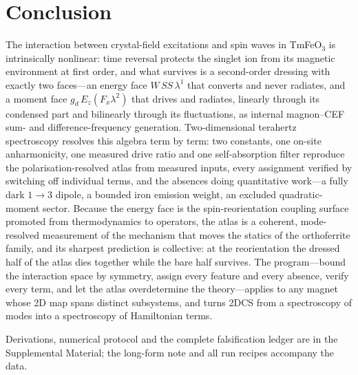 \documentclass[aps,prb,twocolumn,superscriptaddress,longbibliography]{revtex4-2}
\begin{document}
\section{Conclusion}

The interaction between crystal-field excitations and spin waves in
TmFeO$_3$ is intrinsically nonlinear: time reversal protects the
singlet ion from its magnetic environment at first order, and what
survives is a second-order dressing with exactly two faces---an
energy face $W\,SS\,\lambda^1$ that converts and never radiates, and
a moment face $g_d\,E_z(F_x\lambda^2)$ that drives and radiates,
linearly through its condensed part and bilinearly through its
fluctuations, as internal magnon--CEF sum- and difference-frequency
generation.  Two-dimensional terahertz spectroscopy resolves this
algebra term by term: two constants, one on-site anharmonicity, one
measured drive ratio and one self-absorption filter reproduce the
polarisation-resolved atlas from measured inputs, every assignment
verified by switching off individual terms, and the absences doing
quantitative work---a fully dark $1\!\to\!3$ dipole, a bounded iron
emission weight, an excluded quadratic-moment sector.  Because the
energy face is the spin-reorientation coupling surface promoted from
thermodynamics to operators, the atlas is a coherent, mode-resolved
measurement of the mechanism that moves the statics of the
orthoferrite family, and its sharpest prediction is collective: at
the reorientation the dressed half of the atlas dies together while
the bare half survives.  The program---bound the interaction space by
symmetry, assign every feature and every absence, verify every term,
and let the atlas overdetermine the theory---applies to any magnet
whose 2D map spans distinct subsystems, and turns 2DCS from a
spectroscopy of modes into a spectroscopy of Hamiltonian terms.

\begin{acknowledgments}
Derivations, numerical protocol and the complete falsification ledger are
in the Supplemental Material; the long-form note and all run recipes
accompany the data.
\end{acknowledgments}
\end{document}
